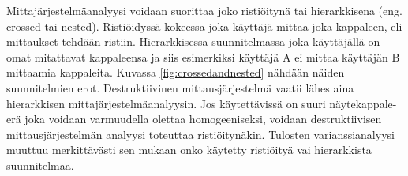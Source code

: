 \documentclass[12pt,a4paper,finnish]{tutthesis}
\begin{document}
Mittajärjestelmäanalyysi voidaan suorittaa joko ristiöitynä tai hierarkkisena
(eng. crossed tai nested). Ristiöidyssä kokeessa joka käyttäjä mittaa joka
kappaleen, eli mittaukset tehdään ristiin. Hierarkkisessa suunnitelmassa
joka käyttäjällä on omat mitattavat kappaleensa ja siis esimerkiksi käyttäjä
A ei mittaa käyttäjän B mittaamia kappaleita. Kuvassa \ref{fig:crossedandnested}
nähdään näiden suunnitelmien erot. Destruktiivinen mittausjärjestelmä
vaatii lähes aina hierarkkisen mittajärjestelmäanalyysin. Jos käytettävissä on
suuri näytekappale-erä joka voidaan varmuudella olettaa homogeeniseksi,
voidaan destruktiivisen mittausjärjestelmän analyysi toteuttaa ristiöitynäkin.
Tulosten varianssianalyysi muuttuu merkittävästi sen mukaan onko
käytetty ristiöityä vai hierarkkista suunnitelmaa.


\begin{figure}
  \begin{center}


\end{center}
\end{figure}
\end{document}
